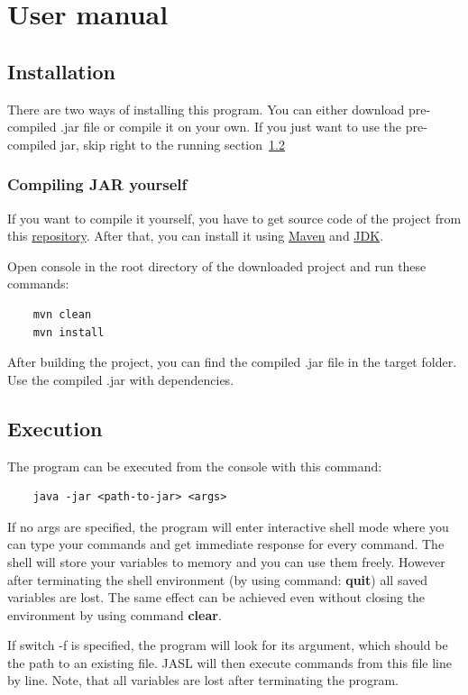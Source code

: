 \documentclass{ctuthesis}
\begin{document}
\chapter{User manual}
\section{Installation}
There are two ways of installing this program. You can either download pre-compiled .jar file or compile it on your own. If you just want to use the pre-compiled jar, skip right to the running section~\ref{sec:execution}

\subsection{Compiling JAR yourself}
If you want to compile it yourself, you have to get source code of the project from this \href{https://github.com/horovtom/jautomata}{repository}. After that, you can install it using \href{https://maven.apache.org/}{Maven} and \href{https://www.oracle.com/technetwork/java/javase/downloads/jdk8-downloads-2133151.html}{JDK}. 

Open console in the root directory of the downloaded project and run these commands:
\begin{verbatim}
	mvn clean
	mvn install
\end{verbatim}

After building the project, you can find the compiled .jar file in the target folder. Use the compiled .jar with dependencies.

\section{Execution}
\label{sec:execution}
The program can be executed from the console with this command:

\begin{verbatim}
	java -jar <path-to-jar> <args>
\end{verbatim}

If no args are specified, the program will enter interactive shell mode where you can type your commands and get immediate response for every command. The shell will store your variables to memory and you can use them freely. However after terminating the shell environment (by using command: \textbf{quit}) all saved variables are lost. The same effect can be achieved even without closing the environment by using command \textbf{clear}. 

If switch -f is specified, the program will look for its argument, which should be the path to an existing file. JASL will then execute commands from this file line by line. Note, that all variables are lost after terminating the program. 
\end{document}
